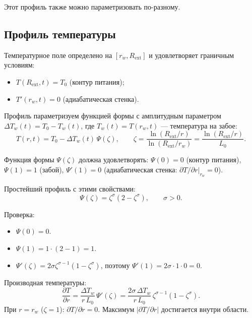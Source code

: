 \documentclass[12pt,a4paper]{article}
\newcommand{\pp}{\partial}
\newcommand{\ext}{\mathrm{ext}}
\begin{document}
Этот профиль также можно параметризовать по-разному.


\subsection{Профиль температуры}\label{ssec:T_profile}

Температурное поле определено на $[r_w, R_\ext]$ и удовлетворяет граничным условиям:
\begin{itemize}[nosep]
  \item $T(R_\ext, t) = T_0$ (контур питания);
  \item $T'(r_w, t) = 0$ (адиабатическая стенка).
\end{itemize}

Профиль параметризуем функцией формы
с амплитудным параметром $\Delta T_w(t) = T_0 - T_w(t)$,
где $T_w(t) = T(r_w, t)$ --- температура на забое:
\begin{equation}\label{eq:T_profile}
  T(r,t) = T_0 - \Delta T_w(t)\,\Psi(\zeta),
  \qquad
  \zeta = \frac{\ln(R_\ext/r)}{\ln(R_\ext/r_w)} = \frac{\ln(R_\ext/r)}{L_0}.
\end{equation}

Функция формы $\Psi(\zeta)$ должна удовлетворять:
$\Psi(0) = 0$ (контур питания),
$\Psi(1) = 1$ (забой),
$\Psi'(1) = 0$ (адиабатическая стенка: $\pp T/\pp r|_{r_w} = 0$).

Простейший профиль с этими свойствами:
\begin{equation}\label{eq:Psi}
  \boxed{
    \Psi(\zeta) = \zeta^\sigma(2 - \zeta^\sigma),
    \qquad \sigma > 0.
  }
\end{equation}

Проверка:
\begin{itemize}[nosep]
  \item $\Psi(0) = 0$. \checkmark
  \item $\Psi(1) = 1\cdot(2-1) = 1$. \checkmark
  \item $\Psi'(\zeta) = 2\sigma\zeta^{\sigma-1}(1 - \zeta^\sigma)$,
        поэтому $\Psi'(1) = 2\sigma\cdot 1\cdot 0 = 0$. \checkmark
\end{itemize}

Производная температуры:
\begin{equation}\label{eq:dT_dr}
  \frac{\pp T}{\pp r}
  = \frac{\Delta T_w}{r\,L_0}\,\Psi'(\zeta)
  = \frac{2\sigma\,\Delta T_w}{r\,L_0}\,
    \zeta^{\sigma-1}(1-\zeta^\sigma).
\end{equation}
При $r = r_w$ ($\zeta = 1$): $\pp T/\pp r = 0$. \checkmark
Максимум $|\pp T/\pp r|$ достигается внутри области.
\end{document}
